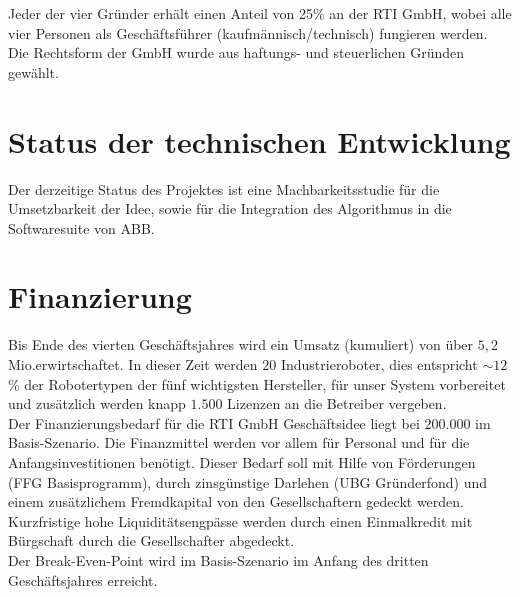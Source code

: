 Jeder der vier Gründer erhält einen Anteil von 25\% an der \textsf{RTI GmbH}, wobei alle vier Personen als Geschäftsführer (kaufmännisch/technisch) fungieren werden. Die Rechtsform der GmbH wurde aus haftungs- und steuerlichen Gründen gewählt.


\section{Status der technischen Entwicklung}

Der derzeitige Status des Projektes ist eine Machbarkeitsstudie für die Umsetzbarkeit der Idee, sowie für die Integration des Algorithmus in die Softwaresuite von ABB.

\section{Finanzierung}
Bis Ende des vierten Geschäftsjahres wird ein Umsatz (kumuliert) von über $5,2$Mio.\thinspace\officialeuro erwirtschaftet. In dieser Zeit werden $20$ Industrieroboter, dies entspricht $\sim12$\% der Robotertypen der fünf wichtigsten Hersteller, für unser System vorbereitet und zusätzlich werden knapp $1.500$ Lizenzen an die Betreiber vergeben.\\
Der Finanzierungsbedarf für die \textsf{RTI GmbH} Geschäftsidee liegt bei $200.000$ \officialeuro im Basis-Szenario. Die Finanzmittel werden vor allem für Personal und für die Anfangsinvestitionen benötigt. Dieser Bedarf soll mit Hilfe von Förderungen (FFG Basisprogramm), durch zinsgünstige Darlehen (UBG Gründerfond) und einem zusätzlichem Fremdkapital von den Gesellschaftern gedeckt werden. Kurzfristige hohe Liquiditätsengpässe werden durch einen Einmalkredit mit Bürgschaft durch die Gesellschafter abgedeckt.\\
Der Break-Even-Point wird im Basis-Szenario im Anfang des dritten Geschäftsjahres erreicht.



